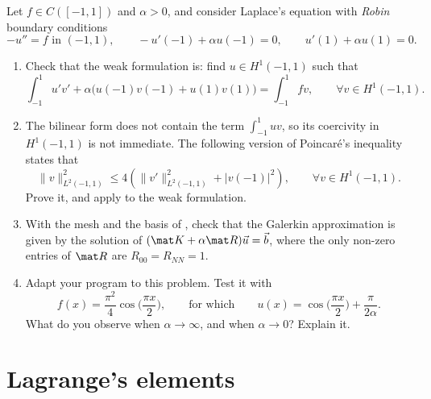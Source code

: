 \begin{exercises}
    Let $f \in C([-1,1])$ and $\alpha > 0$, and consider Laplace's equation with \emph{Robin} boundary conditions
    \begin{equation*}
        -u'' = f \text{ in } (-1,1), \qquad -u'(-1) + \alpha u(-1) = 0, \qquad u'(1) + \alpha u(1) = 0.
    \end{equation*}
    \begin{enumerate}[label=\roman*)]
        \item Check that the weak formulation is: find $u \in H^1(-1,1)$ such that
              \begin{equation*}
                  \int_{-1}^1 u' v' + \alpha \big( u(-1) v(-1) + u(1) v(1) \big) = \int_{-1}^1 f v, \qquad \forall v \in H^1(-1,1).
              \end{equation*}
        \item The bilinear form does not contain the term $\int_{-1}^1 u v$, so its coercivity in $H^1(-1,1)$ is not immediate.
              The following version of Poincaré's inequality states that
              \begin{equation*}
                  \| v \|_{L^2(-1,1)}^2 \le 4 \left( \| v' \|_{L^2(-1,1)}^2 + |v(-1)|^2 \right), \qquad \forall v \in H^1(-1,1).
              \end{equation*}
              Prove it, and apply  to the weak formulation.
        \item With the mesh and the basis of , check that the Galerkin approximation is given by the solution of $(\mat K + \alpha \mat R) \vec u = \vec b$, where the only non-zero entries of $\mat R$ are $R_{00} = R_{NN} = 1$.
        \item Adapt your program to this problem.
              Test it with
              \begin{equation*}
                  f(x) = \frac{\pi^2}{4} \cos \Big( \frac{\pi x}{2} \Big), \qquad \text{for which} \qquad u(x) = \cos \Big( \frac{\pi x}{2} \Big) + \frac{\pi}{2\alpha}.
              \end{equation*}
              What do you observe when $\alpha \to \infty$, and when $\alpha \to 0$? Explain it.
    \end{enumerate}
\end{exercises}

\section{Lagrange's elements}

